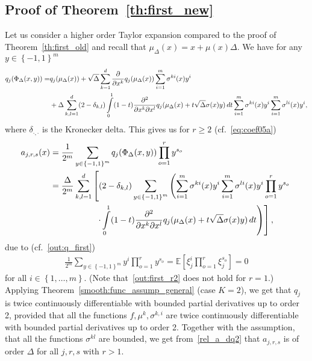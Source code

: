 \documentclass[11pt,a4paper]{amsart}
\theoremstyle{plain}
\theoremstyle{definition}
\theoremstyle{remark}
\numberwithin{equation}{section}
\newcommand*{\EE}{\mathbb E}
\begin{document}
\subsection{Proof of Theorem~\protect\ref{th:first_new}}
Let us consider a higher order Taylor expansion compared to the proof of Theorem~\ref{th:first_old} and recall that $\mu_\Delta(x)=x+\mu(x)\Delta$. We have for any $y\in\left\{-1,1\right\}^m$
\begin{align}
\notag
q_j(\Phi_\Delta(x,y))=&q_j(\mu_\Delta(x))+\sqrt{\Delta}\sum_{k=1}^d\frac{\partial}{\partial x^k}q_j(\mu_\Delta(x))\sum_{i=1}^m\sigma^{ki}(x)y^i\\
\label{out:q_first}
&+\Delta\sum_{k,l=1}^d(2-\delta_{k,l})\int\limits_0^1(1-t)\frac{\partial^2}{\partial x^k\partial x^l}q_j(\mu_\Delta(x)+t\sqrt{\Delta}\sigma(x)y)\,dt\sum_{i=1}^m\sigma^{ki}(x)y^i\sum_{i=1}^m\sigma^{li}(x)y^i,
\end{align}
where $\delta_{\cdot,\cdot}$ is the Kronecker delta. This gives us for $r\ge 2$ (cf.~\eqref{eq:coef05a})
\begin{align}
\notag
a_{j,r,s}(x)&=\frac{1}{2^m}\sum_{y\in\left\{-1,1\right\}^m}
q_j(\Phi_\Delta(x,y))\prod_{o=1}^r y^{s_o}\\
\notag
&=\frac{\Delta}{2^m}\sum_{k,l=1}^d\left[(2-\delta_{k,l})\sum_{y\in\left\{ -1,1\right\} ^{m}}\left(\sum_{i=1}^m\sigma^{ki}(x)y^i\sum_{i=1}^m\sigma^{li}(x)y^i\prod_{o=1}^r y^{s_o}\right.\right.\\
\label{rel_a_dq2}
&\phantom{=\frac{\Delta}{2^m}\sum_{k,l=1}^d\left(\right.}\left.\left.\cdot\int\limits_0^1(1-t)\frac{\partial^2}{\partial x^k\partial x^l}q_j(\mu_\Delta(x)+t\sqrt{\Delta}\sigma(x)y)\,dt\right)\right],
\end{align}
due to (cf.~\eqref{out:q_first})
\begin{align}
\label{out:first_r2}
\frac{1}{2^m}\sum_{y\in\left\{-1,1\right\}^m}y^i\prod_{o=1}^r y^{s_o}=\EE\left[\xi_j^i\prod_{o=1}^r \xi_j^{s_o}\right]=0
\end{align}
for all $i\in\left\{1,\ldots,m\right\}$. (Note that~\eqref{out:first_r2} does not hold for $r=1$.) Applying Theorem~\ref{smooth:func_assump_general} (case $K=2$), we get that $q_j$ is twice continuously differentiable with bounded partial derivatives up to order 2, provided that all the functions $f,\mu^k,\sigma^{k,i}$ are twice continuously differentiable with bounded partial derivatives up to order 2. Together with the assumption, that all the functions $\sigma^{kl}$ are bounded, we get from~\eqref{rel_a_dq2} that $a_{j,r,s}$ is of order $\Delta$ for all $j,r,s$ with $r>1$.
\end{document}
